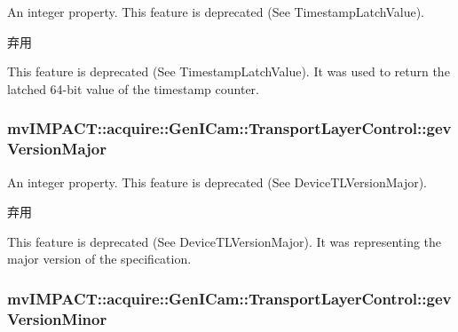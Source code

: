 An integer property. This feature is deprecated (See Timestamp\+Latch\+Value). 

\begin{DoxyRefDesc}{弃用}
\item[\hyperlink{deprecated__deprecated000081}{弃用}]This feature is deprecated (See Timestamp\+Latch\+Value). It was used to return the latched 64-\/bit value of the timestamp counter. \end{DoxyRefDesc}
\hypertarget{classmv_i_m_p_a_c_t_1_1acquire_1_1_gen_i_cam_1_1_transport_layer_control_ad050c03e7fa774908de735b1f0babd6a}{
\subsubsection[{gev\+Version\+Major}]{ mv\+I\+M\+P\+A\+C\+T\+::acquire\+::\+Gen\+I\+Cam\+::\+Transport\+Layer\+Control\+::gev\+Version\+Major}}\label{classmv_i_m_p_a_c_t_1_1acquire_1_1_gen_i_cam_1_1_transport_layer_control_ad050c03e7fa774908de735b1f0babd6a}


An integer property. This feature is deprecated (See Device\+T\+L\+Version\+Major). 

\begin{DoxyRefDesc}{弃用}
\item[\hyperlink{deprecated__deprecated000057}{弃用}]This feature is deprecated (See Device\+T\+L\+Version\+Major). It was representing the major version of the specification. \end{DoxyRefDesc}
\hypertarget{classmv_i_m_p_a_c_t_1_1acquire_1_1_gen_i_cam_1_1_transport_layer_control_a14681ac25aa9a0c4b6e1863645d4e156}{
\subsubsection[{gev\+Version\+Minor}]{ mv\+I\+M\+P\+A\+C\+T\+::acquire\+::\+Gen\+I\+Cam\+::\+Transport\+Layer\+Control\+::gev\+Version\+Minor}}\label{classmv_i_m_p_a_c_t_1_1acquire_1_1_gen_i_cam_1_1_transport_layer_control_a14681ac25aa9a0c4b6e1863645d4e156}



